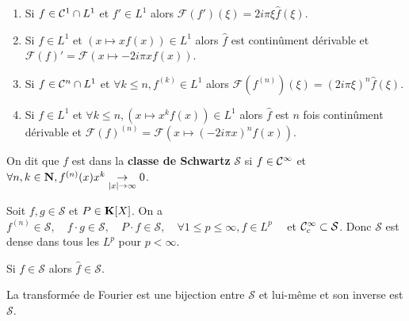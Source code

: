 \begin{thm}
	\begin{enumerate}
		\item Si $f \in \mathcal{C}^1 \cap L^1$ et $f' \in L^1$ alors $\mathcal{F}(f')(\xi) = 2i\pi \xi \hat{f}(\xi)$.
		\item Si $f \in L^1$ et $(x \mapsto x f(x)) \in L^1$ alors $\hat{f}$ est continûment dérivable et $\mathcal{F}(f)' = \mathcal{F}(x \mapsto -2i\pi x f(x))$.
		\item Si $f \in \mathcal{C}^n \cap L^1$ et $\forall k \leq n, f^{(k)} \in L^1$ alors $\mathcal{F}\left( f^{(n)} \right) (\xi) = (2i\pi \xi)^n \hat{f}(\xi)$.
		\item Si $f \in L^1$ et $\forall k \leq n, (x \mapsto x^k f(x)) \in L^1$ alors $\hat{f}$ est $n$ fois continûment dérivable et $\mathcal{F}(f)^{(n)} = \mathcal{F}(x \mapsto (-2i\pi x)^n f(x))$.
	\end{enumerate}
\end{thm}

\begin{defn}
	On dit que $f$ est dans la \textbf{classe de Schwartz} $\mathcal{S}$ si $f \in \mathcal{C}^\infty$ et $\forall n,k \in \mathbf{N}, f^{(n)}(x) x^k \underset{\left\lvert x\right\rvert \to \infty}{\to} 0$.
\end{defn}

\begin{pop}
	Soit $f,g \in \mathcal{S}$ et $P \in \mathbf{K}[X]$. On a $f^{(n)} \in \mathcal{S}, \quad f \cdot g \in \mathcal{S}, \quad P \cdot f \in \mathcal{S}, \quad \forall 1 \leq p \leq \infty, f \in L^p\quad$ et $\mathcal{C}_c^\infty \subset \mathcal{S}$.
	Donc $\mathcal{S}$ est dense dans tous les $L^p$ pour $p < \infty$.
\end{pop}

\begin{thm}
	Si $f \in \mathcal{S}$ alors $\hat{f} \in \mathcal{S}$.
\end{thm}

\begin{thm}
	La transformée de Fourier est une bijection entre $\mathcal{S}$ et lui-même et son inverse est $\mathcal{S}$.
\end{thm} 
